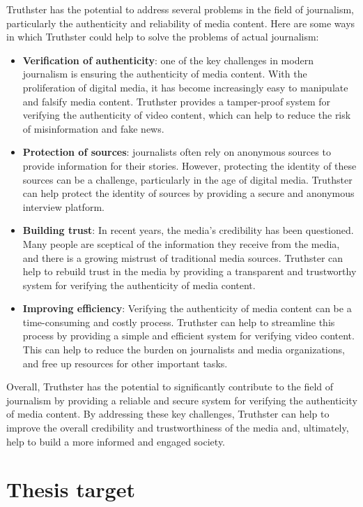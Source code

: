 \documentclass[target=mst,aauheader=]{thud}
\begin{document}
Truthster has the potential to address several problems in the field of journalism, particularly the authenticity and reliability of media content. Here are some ways in which Truthster could help to solve the problems of actual journalism:
\begin{itemize}

    \item \textbf{Verification of authenticity}: one of the key challenges in modern journalism is ensuring the authenticity of media content. With the proliferation of digital media, it has become increasingly easy to manipulate and falsify media content. Truthster provides a tamper-proof system for verifying the authenticity of video content, which can help to reduce the risk of misinformation and fake news.
    \item \textbf{Protection of sources}: journalists often rely on anonymous sources to provide information for their stories. However, protecting the identity of these sources can be a challenge, particularly in the age of digital media. Truthster can help protect the identity of sources by providing a secure and anonymous interview platform.
    \item \textbf{Building trust}: In recent years, the media's credibility has been questioned. Many people are sceptical of the information they receive from the media, and there is a growing mistrust of traditional media sources. Truthster can help to rebuild trust in the media by providing a transparent and trustworthy system for verifying the authenticity of media content.
    \item \textbf{Improving efficiency}: Verifying the authenticity of media content can be a time-consuming and costly process. Truthster can help to streamline this process by providing a simple and efficient system for verifying video content. This can help to reduce the burden on journalists and media organizations, and free up resources for other important tasks.

\end{itemize}

Overall, Truthster has the potential to significantly contribute to the field of journalism by providing a reliable and secure system for verifying the authenticity of media content. By addressing these key challenges, Truthster can help to improve the overall credibility and trustworthiness of the media and, ultimately, help to build a more informed and engaged society.

\section{Thesis target}
\end{document}

